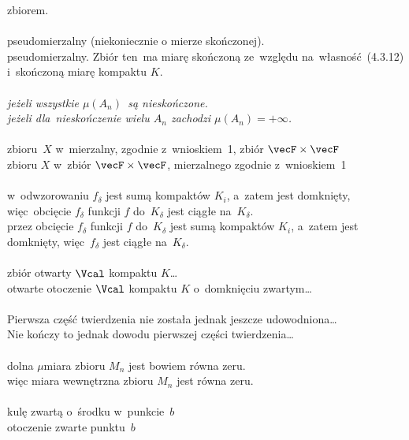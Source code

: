 \documentclass[a4paper,11pt]{article}
\numberwithin{equation}{section}
\begin{document}
zbiorem. \\
 \\
\Jest pseudomierzalny (niekoniecznie o mierze skończonej). \\
\PowinnoByc pseudomierzalny. Zbiór ten~ma miarę skończoną ze~względu
na~własność~(4.3.12) i~skończoną miarę kompaktu $K$. \\
 \\
\Jest \textit{jeżeli wszystkie $\mu( A_{ n } )$~są nieskończone.} \\
\PowinnoByc \textit{jeżeli dla~nieskończenie wielu $A_{ n }$ zachodzi
  $\mu( A_{ n } ) = +\infty$.} \\
 \\
\Jest zbioru~$X$ w~mierzalny, zgodnie z~wnioskiem~1,
zbiór $\vecF \times \vecF$ \\
\PowinnoByc zbioru $X$ w~zbiór $\vecF \times \vecF$, mierzalnego
zgodnie z~wnioskiem~1 \\
 \\
\Jest w~odwzorowaniu $f_{ \delta }$ jest sumą kompaktów $K_{ i }$,
a~zatem jest domknięty, więc~obcięcie $f_{ \delta }$ funkcji $f$
do~$K_{ \delta }$ jest ciągłe na~$K_{ \delta }$. \\
\PowinnoByc przez obcięcie $f_{ \delta }$ funkcji $f$ do~$K_{ \delta }$
jest sumą kompaktów $K_{ i }$, a~zatem jest domknięty,
więc~$f_{ \delta }$ jest ciągłe na~$K_{ \delta }$. \\
 \\
\Jest zbiór otwarty $\Vcal$ kompaktu $K$\ldots \\
\PowinnoByc otwarte otoczenie $\Vcal$ kompaktu $K$ o~domknięciu
zwartym\ldots \\
 \\
\Jest Pierwsza część twierdzenia nie została jednak jeszcze
udowodniona\ldots \\
\PowinnoByc Nie kończy to jednak dowodu pierwszej części twierdzenia\ldots \\
 \\
\Jest dolna $\mu$\dywiz miara zbioru $M_{ n }$ jest bowiem równa zeru. \\
\PowinnoByc więc miara wewnętrzna zbioru $M_{ n }$ jest równa zeru. \\
 \\
\Jest kulę zwartą o~środku w~punkcie~$b$ \\
\PowinnoByc otoczenie zwarte punktu~$b$ \\
\end{document}

